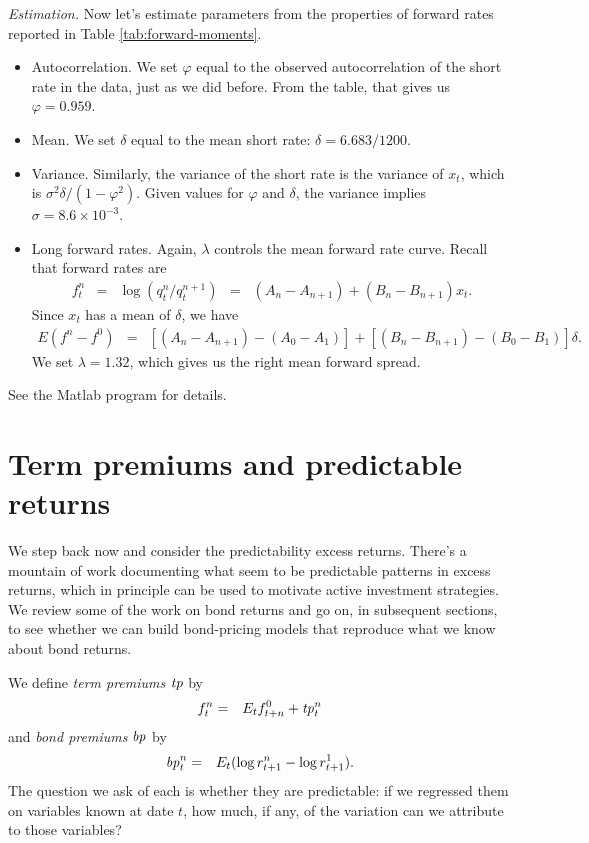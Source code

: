 \documentclass[11pt]{article}
\newcommand{\tp}{\mbox{\it tp\/}}
\newcommand{\bp}{\mbox{\it bp\/}}
\begin{document}
{\it Estimation.\/}
Now let's estimate parameters from the properties of forward rates
reported in Table \ref{tab:forward-moments}.
%
\begin{itemize}
\item Autocorrelation.
We set $\varphi$ equal to the observed autocorrelation of the short rate in the data,
just as we did before.
From the table, that gives us $\varphi = 0.959$.

\item Mean.  We set $\delta$ equal to the mean short rate:
$\delta = 6.683/1200$.

\item Variance.  Similarly, the variance of the short rate is the variance of $x_t$,
which is $ \sigma^2 \delta/(1-\varphi^2)$.
Given values for $\varphi$ and $\delta$,
the variance implies $\sigma = 8.6\times 10^{-3}$.

\item Long forward rates.  Again,
$\lambda$ controls the mean forward rate curve.
Recall that forward rates are
\begin{eqnarray*}
    f^n_t &=& \log (q^n_t/q^{n+1}_t)
                \;\;=\;\;  (A_n - A_{n+1}) + (B_n - B_{n+1}) x_t .
\end{eqnarray*}
Since $x_t$ has a  mean of $\delta$,  we have
\begin{eqnarray*}
    E (f^n - f^0) &=&  [(A_n - A_{n+1}) - (A_0 - A_{1})] +
        [(B_n - B_{n+1}) - (B_0 - B_{1})] \delta.
\end{eqnarray*}
We set $\lambda=1.32$, which gives us the right mean forward spread.

\end{itemize}
See the Matlab program for details.



\section{Term premiums and predictable returns}

We step back now and consider the predictability excess returns.
There's a mountain of work documenting what seem to be predictable patterns
in excess returns, which in principle can be used to motivate active
investment strategies.
We review some of the work on bond returns and go on, in subsequent sections,
to see whether we can build bond-pricing models that reproduce
what we know about bond returns.


We define {\it term premiums\/} $\tp$ by
\begin{eqnarray}
    f^n_t &=&  E_t f^0_{t+n} + \tp^n_t
    \label{eq:tp}
\end{eqnarray}
and {\it bond premiums\/} $\bp$ by
\begin{eqnarray*}
    \bp^n_t &=& E_t (\log r^n_{t+1}  - \log r^1_{t+1}) .
\end{eqnarray*}
The question we ask of each is whether they are predictable:
if we regressed them on variables known at date $t$,
how much, if any, of the variation can we attribute to those variables?
\end{document}
